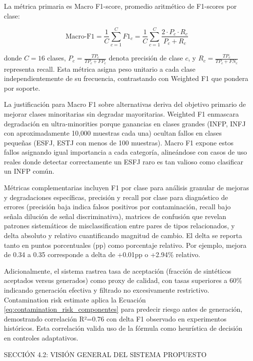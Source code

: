 La métrica primaria es Macro F1-score, promedio aritmético de F1-scores por clase:

\begin{equation}
\text{Macro-F1} = \frac{1}{C} \sum_{c=1}^{C} F1_c = \frac{1}{C} \sum_{c=1}^{C} \frac{2 \cdot P_c \cdot R_c}{P_c + R_c}
\label{eq:macro_f1}
\end{equation}

donde $C=16$ clases, $P_c = \frac{TP_c}{TP_c + FP_c}$ denota precisión de clase $c$, y $R_c = \frac{TP_c}{TP_c + FN_c}$ representa recall. Esta métrica asigna peso unitario a cada clase independientemente de su frecuencia, contrastando con Weighted F1 que pondera por soporte.

La justificación para Macro F1 sobre alternativas deriva del objetivo primario de mejorar clases minoritarias sin degradar mayoritarias. Weighted F1 enmascara degradación en ultra-minorities porque ganancias en clases grandes (INFP, INFJ con aproximadamente 10,000 muestras cada una) ocultan fallos en clases pequeñas (ESFJ, ESTJ con menos de 100 muestras). Macro F1 expone estos fallos asignando igual importancia a cada categoría, alineándose con casos de uso reales donde detectar correctamente un ESFJ raro es tan valioso como clasificar un INFP común.

Métricas complementarias incluyen F1 por clase para análisis granular de mejoras y degradaciones específicas, precisión y recall por clase para diagnóstico de errores (precisión baja indica falsos positivos por contaminación, recall bajo señala dilución de señal discriminativa), matrices de confusión que revelan patrones sistemáticos de misclassification entre pares de tipos relacionados, y delta absoluto y relativo cuantificando magnitud de cambio. El delta se reporta tanto en puntos porcentuales (pp) como porcentaje relativo. Por ejemplo, mejora de 0.34 a 0.35 corresponde a delta de +0.01pp o +2.94\% relativo.

Adicionalmente, el sistema rastrea tasa de aceptación (fracción de sintéticos aceptados versus generados) como proxy de calidad, con tasas superiores a 60\% indicando generación efectiva y filtrado no excesivamente restrictivo. Contamination risk estimate aplica la Ecuación \ref{eq:contamination_risk_componentes} para predecir riesgo antes de generación, demostrando correlación R²=0.76 con delta F1 observado en experimentos históricos. Esta correlación valida uso de la fórmula como heurística de decisión en controles adaptativos.

SECCIÓN 4.2: VISIÓN GENERAL DEL SISTEMA PROPUESTO

